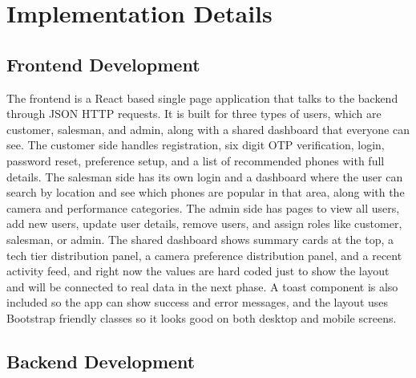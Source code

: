 \documentclass[12pt, a4paper]{report}
\numberwithin{equation}{chapter}
\begin{document}
\section{Implementation Details}

\subsection{Frontend Development}

The frontend is a React based single page application that talks to the backend through JSON HTTP requests. It is built for three types of users, which are customer, salesman, and admin, along with a shared dashboard that everyone can see. The customer side handles registration, six digit OTP verification, login, password reset, preference setup, and a list of recommended phones with full details. The salesman side has its own login and a dashboard where the user can search by location and see which phones are popular in that area, along with the camera and performance categories. The admin side has pages to view all users, add new users, update user details, remove users, and assign roles like customer, salesman, or admin. The shared dashboard shows summary cards at the top, a tech tier distribution panel, a camera preference distribution panel, and a recent activity feed, and right now the values are hard coded just to show the layout and will be connected to real data in the next phase. A toast component is also included so the app can show success and error messages, and the layout uses Bootstrap friendly classes so it looks good on both desktop and mobile screens.

\subsection{Backend Development}
\end{document}
